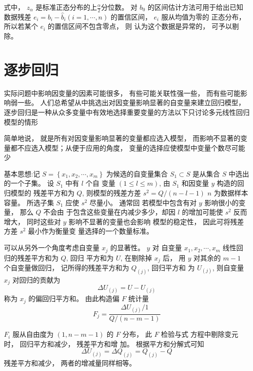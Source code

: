 式中， $  {z}_{\alpha}  $ 是标准正态分布的上$\frac{\alpha}{2} $分位数。 
对 $  {b}_{0}  $ 的区间估计方法可用于给出已知数据残差 $  {e}_{i}={b}_{{i}}-\hat{{b}}_{{i}}({i}={1}, \cdots, {n})  $ 的置信区间， $  {e}_{i}  $ 服从均值为零的
正态分布， 所以若某个 $  e_{i}  $ 的置信区间不包含零点， 则 认为这个数据是异常的， 可予以剔除。 

\section{逐步回归}

实际问题中影响因变量的因素可能很多， 有些可能关联性强一些， 而有些可能影响弱一些。 人们总希望从中挑选出对因变量影响显著的自变量来建立回归模型， 逐步回归是一种从众多变量中有效地选择重要变量的方法以下只讨论多元线性回归模型的情形

简单地说， 就是所有对因变量影响显著的变量都应选入模型， 而影响不显著的变量都不应选入模型；从便于应用的角度， 变量的选择应使模型中变量个数尽可能少

基本思想:记 $  {S}=\left\{{x}_{1}, {x}_{2}, \cdots, {x}_{m}\right\}  $ 为候选的自变量集合
$  {S}_{1} \subset {S}  $ 是从集合 $  {S}  $ 中选出的一个子集。 设 $  {S}_{1}  $ 中有 $  {l}  $ 个自
变量 $  (1 \leq l \leq m)  $, 由 $  S_{1}  $ 和因变量 $  y  $ 构造的回归模型的 残差平方和为 $  Q  $, 则模型的残差方差 $  {s}^{2}={Q} /({n}-{l}-{1})  $
$  {n}  $ 为数据样本容量。 所选子集 $  {S}_{1}  $ 应使 $  {s}^{2}  $ 尽量小。 通常回
若模型中包含有对 $  y  $ 影响很小的变量， 那么 $  Q  $ 不会由 于包含这些变量在内减少多少，却因 $  l  $ 的增加可能使 $  s^{2}  $ 反而增大， 同时这些对 $  {y}  $ 影响不显著的变量也会影响 模型的稳定性， 因此可将残差方差 $  {s}^{2}  $ 最小作为衡量变
量选择的一个数量标准。 

可以从另外一个角度考虑自变量 $  {x}_{j}  $ 的显著性。  $  {y}  $ 对 自变量 $  {x}_{{1}}, {x}_{2}, \cdots, {x}_{m}  $ 线性回归的残差平方和为 $  {Q}  $, 回归
平方和为 $  U  $, 在剔除掉 $  {x}_{j}  $ 后， 用 $  {y}  $ 对其余的 $  {m}-{1}  $ 个自变量做回归， 记所得的残差平方和为 $ Q_{(j)} $, 回归平方和
为 $  U_{(j)}  $, 则自变量 $  x_{j}  $ 对回归的贡献为
\begin{equation}
\Delta {U}_{(j)}={U}-{U}_{(j)}
\end{equation}
称为 $  {x}_{{j}}  $ 的偏回归平方和。 由此构造偏 $  {F}  $ 统计量
\begin{equation}
F_{j}=\frac{\Delta U_{(j)} / 1}{Q /(n-m-1)}
\end{equation}

$  {F}_{i}  $ 服从自由度为 $  ({1}, {n}-{m}-{1})  $ 的 $  {F}  $ 分布， 此 $  {F}  $ 检验与式
方程中剔除变元时， 回归平方和减少， 残差平方和增 加。 根据平方和分解式可知
\begin{equation}
\Delta {U}_{(j)}=\Delta {Q}_{(j)}={Q}_{(j)}-{Q}
\end{equation}
残差平方和减少， 两者的增减量同样相等。 

